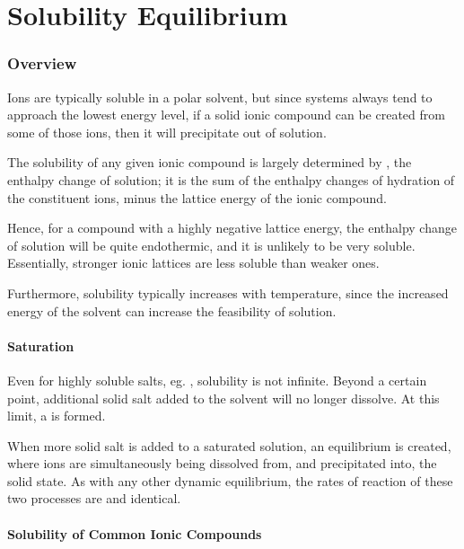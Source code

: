 
\pagebreak
\part{Solubility Equilibrium}

	\section{Overview}

		Ions are typically soluble in a polar solvent, but since systems always tend to approach the lowest energy level, if a solid ionic
		compound can be created from some of those ions, then it will precipitate out of solution.

		The solubility of any given ionic compound is largely determined by , the enthalpy change of solution; it is the sum
		of the enthalpy changes of hydration of the constituent ions, minus the lattice energy of the ionic compound.

		Hence, for a compound with a highly negative lattice energy, the enthalpy change of solution will be quite endothermic, and it is
		unlikely to be very soluble. Essentially, stronger ionic lattices are less soluble than weaker ones.

		Furthermore, solubility typically increases with temperature, since the increased energy of the solvent can increase the feasibility of
		solution.

		\subsection{Saturation}

			Even for highly soluble salts, eg. , solubility is not infinite. Beyond a certain point, additional solid salt added
			to the solvent will no longer dissolve. At this limit, a  is formed.

			When more solid salt is added to a saturated solution, an equilibrium is created, where ions are simultaneously being dissolved from,
			and precipitated into, the solid state. As with any other dynamic equilibrium, the rates of reaction of these two processes are
			 and identical.



		\pagebreak
		\subsection{Solubility of Common Ionic Compounds}

